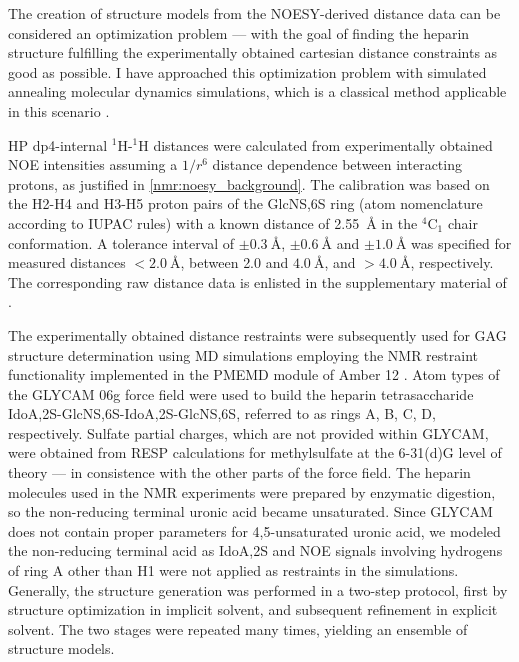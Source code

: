 The creation of structure models from the NOESY-derived distance data can be
considered an optimization problem --- with the goal of finding the heparin
structure fulfilling the experimentally obtained cartesian distance constraints
as good as possible. I have approached this optimization problem with simulated
annealing molecular dynamics simulations, which is a classical method applicable
in this scenario \cite{nilges_sim_annealing_noe_1988}.

HP dp4-internal ${}^1$H-${}^1$H distances were calculated from experimentally
obtained NOE intensities assuming a $1/r^6$ distance dependence between
interacting protons, as justified in \cref{nmr:noesy_background}. The
calibration was based on the H2-H4 and H3-H5 proton pairs of the GlcNS,6S ring
(atom nomenclature according to IUPAC rules) with a known distance of
\SI{2.55}{\angstrom} in the ${}^4$C${}_1$ chair conformation. A tolerance
interval of $\pm \SI{0.3}{\angstrom}$, $\pm \SI{0.6}{\angstrom}$ and $\pm
\SI{1.0}{\angstrom}$ was specified for measured distances $<
\SI{2.0}{\angstrom}$, between \num{2.0} and $\SI{4.0}{\angstrom}$, and $>
\SI{4.0}{\angstrom}$, respectively. The corresponding raw distance data is
enlisted in the supplementary material of \cite{kuenze_gehrcke_2014}.

The experimentally obtained distance restraints were subsequently used for GAG
structure determination using MD simulations employing the NMR restraint
functionality implemented in the PMEMD module of Amber 12 \cite{case_amber_12}.
Atom types of the GLYCAM 06g force field \cite{kirschner_glycam06:_2008} were
used to build the heparin tetrasaccharide IdoA,2S-GlcNS,6S-IdoA,2S-GlcNS,6S,
referred to as rings A, B, C, D, respectively. Sulfate partial charges, which
are not provided within GLYCAM, were obtained from RESP calculations for
methylsulfate at the 6-31(d)G level of theory --- in consistence with the other
parts of the force field. The heparin molecules used in the NMR experiments were
prepared by enzymatic digestion, so the non-reducing terminal uronic acid became
unsaturated. Since GLYCAM does not contain proper parameters for 4,5-unsaturated
uronic acid, we modeled the non-reducing terminal acid as IdoA,2S and NOE
signals involving hydrogens of ring A other than H1 were not applied as
restraints in the simulations. Generally, the structure generation was performed
in a two-step protocol, first by structure optimization in implicit solvent, and
subsequent refinement in explicit solvent. The two stages were repeated many
times, yielding an ensemble of structure models.

